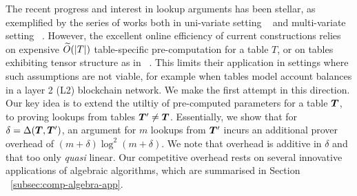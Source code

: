 
The recent progress and interest in lookup arguments has been stellar, as exemplified by the series of works
both in uni-variate setting ~\cite{CCS:ZBKMNS22,EPRINT:PosKat22,EPRINT:ZGKMR22,EPRINT:EagFioGab22} and multi-variate
setting ~\cite{lasso}. However, the excellent online efficiency of current constructions relies on expensive
$\widetilde{O}(|T|)$ table-specific  pre-computation for a table $T$, or on tables exhibiting tensor structure as in ~\cite{lasso}.
This limits their application in settings where such assumptions are not viable, for example when tables model account balances in
a layer 2 (L2) blockchain network. We make the first attempt in this direction. Our key idea is to extend the utiltiy of pre-computed
parameters for a table $\vecT$, to proving lookups from tables $\vecT'\neq \vecT$. Essentially, we show that for $\delta=\Delta(\vecT, \vecT')$,
an argument for $m$ lookups from $\vecT'$ incurs an additional prover overhead of $(m+\delta)\log^2(m+\delta)$. We note that overhead is additive
in $\delta$ and that too only {\em quasi} linear. Our competitive overhead rests on several innovative applications of algebraic
algorithms, which are summarised in Section ~\ref{subsec:comp-algebra-app}.

